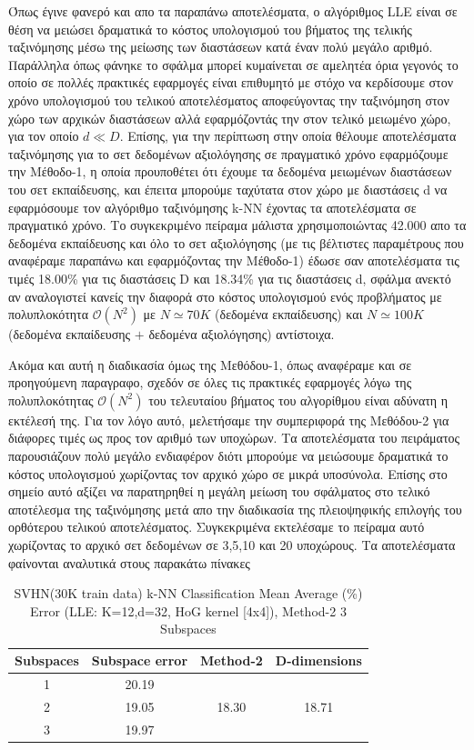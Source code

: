 \par
Όπως έγινε φανερό και απο τα παραπάνω αποτελέσματα, ο αλγόριθμος \textlatin{LLE} είναι σε θέση να μειώσει δραματικά το κόστος υπολογισμού του βήματος της τελικής ταξινόμησης μέσω της μείωσης των διαστάσεων κατά έναν πολύ μεγάλο αριθμό. Παράλληλα όπως φάνηκε το σφάλμα μπορεί κυμαίνεται σε αμελητέα όρια γεγονός το οποίο σε πολλές πρακτικές εφαρμογές είναι επιθυμητό με στόχο να κερδίσουμε στον χρόνο υπολογισμού του τελικού αποτελέσματος αποφεύγοντας την ταξινόμηση στον χώρο των αρχικών διαστάσεων αλλά εφαρμόζοντάς την στον τελικό μειωμένο χώρο, για τον οποίο $d \ll D$. Επίσης, για την περίπτωση στην οποία θέλουμε αποτελέσματα ταξινόμησης για το σετ δεδομένων αξιολόγησης σε πραγματικό χρόνο εφαρμόζουμε την Μέθοδο-1, η οποία προυποθέτει ότι έχουμε τα δεδομένα μειωμένων διαστάσεων του σετ εκπαίδευσης, και έπειτα μπορούμε ταχύτατα στον χώρο με διαστάσεις \textlatin{d} να εφαρμόσουμε τον αλγόριθμο ταξινόμησης \textlatin{k-NN} έχοντας τα αποτελέσματα σε πραγματικό χρόνο. Το συγκεκριμένο πείραμα μάλιστα χρησιμοποιώντας 42.000 απο τα δεδομένα εκπαίδευσης και όλο το σετ αξιολόγησης (με τις βέλτιστες παραμέτρους που αναφέραμε παραπάνω και εφαρμόζοντας την Μέθοδο-1) έδωσε σαν αποτελέσματα τις τιμές 18.00\% για τις διαστάσεις \textlatin{D} και 18.34\% για τις διαστάσεις \textlatin{d}, σφάλμα ανεκτό αν αναλογιστεί κανείς την διαφορά στο κόστος υπολογισμού ενός προβλήματος με πολυπλοκότητα $ \mathcal{O}(N^2)$ με $N \simeq 70K$ (δεδομένα εκπαίδευσης) και $N \simeq 100K$ (δεδομένα εκπαίδευσης $+$ δεδομένα αξιολόγησης) αντίστοιχα.
\par
Ακόμα και αυτή η διαδικασία όμως της Μεθόδου-1, όπως αναφέραμε και σε προηγούμενη παραγραφο, σχεδόν σε όλες τις πρακτικές εφαρμογές λόγω της πολυπλοκότητας $ \mathcal{O}(N^2)$  του τελευταίου βήματος του αλγορίθμου είναι αδύνατη η εκτέλεσή της. Για τον λόγο αυτό, μελετήσαμε την συμπεριφορά της Μεθόδου-2 για διάφορες τιμές ως προς τον αριθμό των υποχώρων. Τα αποτελέσματα του πειράματος παρουσιάζουν πολύ μεγάλο ενδιαφέρον διότι μπορούμε να μειώσουμε δραματικά το κόστος υπολογισμού χωρίζοντας τον αρχικό χώρο σε μικρά υποσύνολα. Επίσης στο σημείο αυτό αξίζει να παρατηρηθεί η μεγάλη μείωση του σφάλματος στο τελικό αποτέλεσμα της ταξινόμησης μετά απο την διαδικασία της πλειοψηφικής επιλογής του ορθότερου τελικού αποτελέσματος. Συγκεκριμένα εκτελέσαμε το πείραμα αυτό χωρίζοντας το αρχικό σετ δεδομένων σε 3,5,10 και 20 υποχώρους. Τα αποτελέσματα φαίνονται αναλυτικά στους παρακάτω πίνακες
\begin{table}[H]
\centering
\label{tab:table15}
\begin{tabular}{|c|c|c|c|}
\hline
\textlatin{Subspaces} & \textlatin{Subspace error} & \textlatin{Method-2} & \textlatin{D-dimensions}  \\
\hline
1 & 20.19 & & \\
2 & 19.05 & 18.30 & 18.71 \\
3 & 19.97 & & \\
\hline
\end{tabular}
\caption{\textlatin{SVHN(30K train data) k-NN Classification Mean Average (\%) Error (LLE: K=12,d=32, HoG kernel [4x4]), Method-2 3 Subspaces}}
\end{table}

